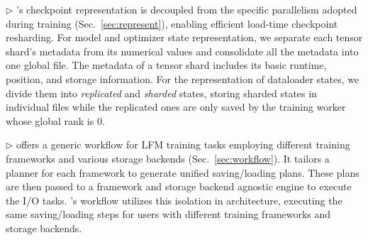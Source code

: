$\triangleright$ \sys{}'s checkpoint 
representation is decoupled from the specific parallelism adopted during training 
(Sec.~\ref{sec:represent}), enabling efficient load-time checkpoint resharding.
For model and optimizer state representation, 
we separate each tensor shard's metadata from its numerical values and consolidate all the metadata into one global file.
The metadata of a tensor shard includes its basic runtime, position, and storage information. 
For the representation of dataloader states, we divide them into \textit{replicated} and \textit{sharded} states,
storing sharded states in individual files while the replicated ones are only saved by the training worker whose global rank is 0.

$\triangleright$ \sys{} offers a generic workflow for LFM training tasks employing different training frameworks and various storage backends (Sec.~\ref{sec:workflow}).
It tailors a planner for each framework to generate unified saving/loading plans.
These plans are then passed to a framework and storage backend agnostic engine to execute the I/O tasks.
\sys{}'s workflow utilizes this isolation in architecture, executing the same saving/loading steps for users with different training frameworks and storage backends.

